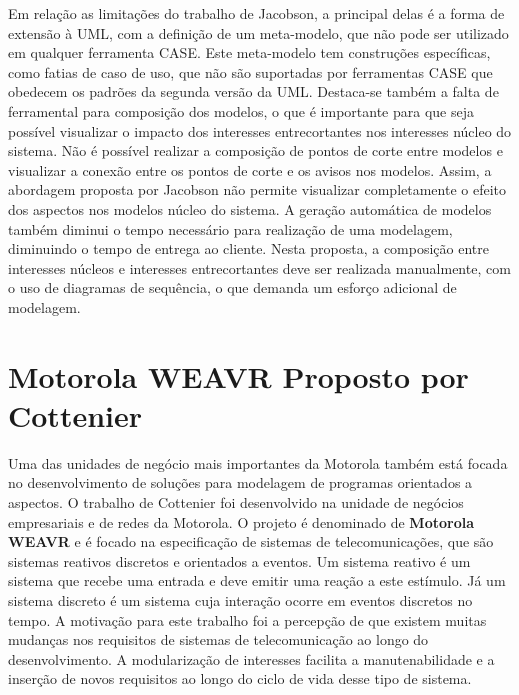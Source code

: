 Em relação as limitações do trabalho de Jacobson, a principal delas é a forma de extensão à UML, com a definição de um meta-modelo, que não pode ser utilizado 
em qualquer ferramenta CASE. Este meta-modelo tem construções específicas, como fatias de caso de uso, que não são suportadas por ferramentas CASE que
obedecem os padrões da segunda versão da UML. Destaca-se também a falta de ferramental para composição dos modelos, o que é importante para que seja
possível visualizar o impacto dos interesses entrecortantes nos interesses núcleo do sistema. Não é possível realizar a composição de pontos de corte entre modelos e visualizar a conexão entre os pontos de corte e os avisos nos modelos. Assim, a abordagem proposta por
Jacobson não permite visualizar completamente o efeito dos aspectos nos modelos núcleo do sistema. A geração automática de modelos também diminui o
tempo necessário para realização de uma modelagem, diminuindo o tempo de entrega ao cliente. Nesta proposta, a composição entre interesses núcleos e
interesses entrecortantes deve ser realizada manualmente, com o uso de diagramas de sequência, o que demanda um esforço adicional de modelagem.

\section{Motorola WEAVR Proposto por Cottenier}

Uma das unidades de negócio mais importantes da Motorola também está focada no desenvolvimento de soluções para modelagem de programas orientados a
aspectos. O trabalho de Cottenier \cite{Cottenier06themotorola} \cite{Cottenier:2007:SAC:1229375.1229377} foi desenvolvido na unidade de negócios empresariais e de redes da
Motorola. O projeto é denominado de \textbf{Motorola WEAVR} e é focado na especificação de sistemas de telecomunicações, que são sistemas reativos
discretos e orientados a eventos. Um sistema reativo é um sistema que recebe uma entrada e deve emitir uma reação a este estímulo. Já um sistema discreto é um sistema cuja
interação ocorre em eventos discretos no tempo. A motivação para este trabalho foi a percepção de que existem muitas mudanças nos requisitos de 
sistemas de telecomunicação ao longo do desenvolvimento. A modularização de interesses facilita a manutenabilidade e a inserção de novos requisitos ao
longo do ciclo de vida desse tipo de sistema. 

